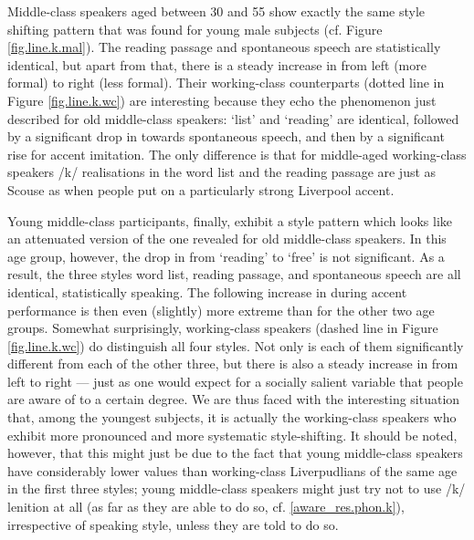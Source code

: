 Middle-class speakers aged between 30 and 55 show exactly the same style shifting pattern that was found for young male subjects (cf. Figure \ref{fig.line.k.mal}).
The reading passage and spontaneous speech are statistically identical, but apart from that, there is a steady increase in  from left (more formal) to right (less formal).
Their working-class counterparts (dotted line in Figure \ref{fig.line.k.wc}) are interesting because they echo the phenomenon just described for old middle-class speakers: `list' and `reading' are identical, followed by a significant drop in  towards spontaneous speech, and then by a significant rise for accent imitation.
The only difference is that for middle-aged working-class speakers /k/ realisations in the word list and the reading passage are just as Scouse as when people put on a particularly strong Liverpool accent.

Young middle-class participants, finally, exhibit a style pattern which looks like an attenuated version of the one revealed for old middle-class speakers.
In this age group, however, the drop in  from `reading' to `free' is not significant.
As a result, the three styles word list, reading passage, and spontaneous speech are all identical, statistically speaking.
The following increase in  during accent performance is then even (slightly) more extreme than for the other two age groups.
Somewhat surprisingly, working-class speakers (dashed line in Figure \ref{fig.line.k.wc}) do distinguish all four styles.
Not only is each of them significantly different from each of the other three, but there is also a steady increase in  from left to right --- just as one would expect for a socially salient variable that people are aware  of to a certain degree.
We are thus faced with the interesting situation that, among the youngest subjects, it is actually the working-class speakers who exhibit more pronounced and more systematic style-shifting.
It should be noted, however, that this might just be due to the fact that young middle-class speakers have considerably lower  values than working-class Liverpudlians of the same age in the first three styles; young middle-class speakers might just try not to use /k/ lenition at all (as far as they are able to do so, cf. \ref{aware_res.phon.k}), irrespective of speaking style, unless they are told to do so.